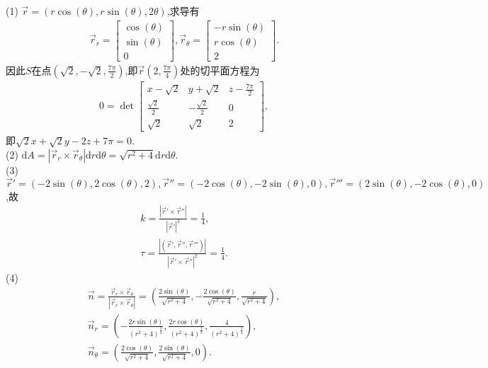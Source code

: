 \begin{solution}
    (1) $\overrightarrow{r}=(r\cos (\theta),r \sin (\theta), 2 \theta)$,求导有
    \begin{align*}
        \overrightarrow{r}_r=\begin{bmatrix}
            \cos(\theta)\\ \sin(\theta)\\ 0
        \end{bmatrix},
        \overrightarrow{r}_\theta=\begin{bmatrix}
            -r\sin(\theta)\\ r\cos(\theta)\\ 2
        \end{bmatrix}.
    \end{align*}
    因此$S$在点$\displaystyle (\sqrt{2},-\sqrt{2},\frac{7 \pi}{2})$,即$\displaystyle \overrightarrow{r}(2,\frac{7 \pi}{4})$处的切平面方程为
    \begin{align*}
        0=\det \begin{bmatrix} \displaystyle
            x-\sqrt{2} &y+\sqrt{2} &z-\frac{7 \pi}{2}\\
            \frac{\sqrt{2}}{2} &-\frac{\sqrt{2}}{2} &0 \\
            \sqrt{2} &\sqrt{2} &2
        \end{bmatrix},
    \end{align*}
    即$\sqrt{2} x+\sqrt{2} y-2 z+7 \pi =0$.\\
    (2) $\mathrm{d}A=|\overrightarrow{r}_r \times \overrightarrow{r}_\theta | \mathrm{d}r \mathrm{d}\theta=\sqrt{r ^2+4 }\mathrm{d}r \mathrm{d}\theta $.\\
    (3) $\overrightarrow{r}'=(-2 \sin(\theta),2\cos(\theta),2),\overrightarrow{r}''=(-2\cos(\theta),-2\sin(\theta),0),\overrightarrow{r}'''=(2\sin(\theta),-2\cos(\theta),0)$,故
    \begin{align*}
        k=\frac{|\overrightarrow{r}' \times \overrightarrow{r}''|}{|\overrightarrow{r}'|^3}= \frac{1}{4},\\
        \tau=\frac{|(\overrightarrow{r}',\overrightarrow{r}'',\overrightarrow{r}''')|}{|\overrightarrow{r}' \times \overrightarrow{r}''|^2}=\frac{1}{4}.
    \end{align*}
    (4) 
    \begin{gather*}
        \overrightarrow{n}=\frac{\overrightarrow{r}_r \times \overrightarrow{r}_\theta}{|\overrightarrow{r}_r \times \overrightarrow{r}_\theta|}=(\frac{2\sin(\theta)}{\sqrt{r^2+4}},-\frac{2\cos(\theta)}{\sqrt{r^2+4}},\frac{r}{\sqrt{r^2+4}}), \\ \overrightarrow{n}_r=(-\frac{2r\sin(\theta)}{(r^2+4)^{\frac{3}{2}}},\frac{2r\cos(\theta)}{(r^2+4)^{\frac{3}{2}}},\frac{4}{(r^2+4)^{\frac{3}{2}}}), \\ \overrightarrow{n}_\theta=(\frac{2\cos(\theta)}{\sqrt{r^2+4}},\frac{2\sin(\theta)}{\sqrt{r^2+4}},0).

\end{gather*}
\end{solution}
